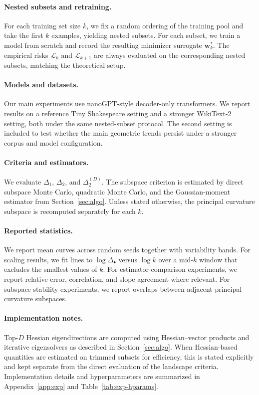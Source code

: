 \documentclass[10pt]{article}
\theoremstyle{plain}
\theoremstyle{remark}
\begin{document}
\paragraph{Nested subsets and retraining.}
For each training set size $k$, we fix a random ordering of the training pool and take the first $k$ examples, yielding nested subsets.
For each subset, we train a model from scratch and record the resulting minimizer surrogate $\mathbf w_k^*$.
The empirical risks $\mathcal L_k$ and $\mathcal L_{k+1}$ are always evaluated on the corresponding nested subsets, matching the theoretical setup.

\paragraph{Models and datasets.}
Our main experiments use nanoGPT-style decoder-only transformers.
We report results on a reference Tiny Shakespeare setting and a stronger WikiText-2 setting, both under the same nested-subset protocol.
The second setting is included to test whether the main geometric trends persist under a stronger corpus and model configuration.

\paragraph{Criteria and estimators.}
We evaluate $\Delta_1$, $\Delta_2$, and $\Delta_2^{(D)}$.
The subspace criterion is estimated by direct subspace Monte Carlo, quadratic Monte Carlo, and the Gaussian-moment estimator from Section~\ref{sec:algo}.
Unless stated otherwise, the principal curvature subspace is recomputed separately for each $k$.

\paragraph{Reported statistics.}
We report mean curves across random seeds together with variability bands.
For scaling results, we fit lines to $\log \Delta_\bullet$ versus $\log k$ over a mid-$k$ window that excludes the smallest values of $k$.
For estimator-comparison experiments, we report relative error, correlation, and slope agreement where relevant.
For subspace-stability experiments, we report overlaps between adjacent principal curvature subspaces.

\paragraph{Implementation notes.}
Top-$D$ Hessian eigendirections are computed using Hessian--vector products and iterative eigensolvers as described in Section~\ref{sec:algo}.
When Hessian-based quantities are estimated on trimmed subsets for efficiency, this is stated explicitly and kept separate from the direct evaluation of the landscape criteria.
Implementation details and hyperparameters are summarized in Appendix~\ref{app:exp} and Table~\ref{tab:exp-hparams}.
\end{document}
